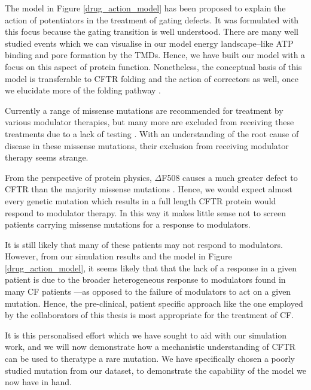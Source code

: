 The model in Figure \ref {drug_action_model} has been proposed to explain the action of potentiators in the treatment of gating defects. It was formulated with this focus because the gating transition is well understood. There are many well studied events which we can visualise in our model energy landscape--like ATP binding and pore formation by the TMDs. Hence, we have built our model with a focus on this aspect of protein function. Nonetheless, the conceptual basis of this model is transferable to CFTR folding and the action of correctors as well, once we elucidate more of the folding pathway \cite{krainer2018, kleizen2021, kleizen2020, padanyi2022, fiedorczuk2022}. 

Currently a range of missense mutations are recommended for treatment by various modulator therapies, but many more are excluded from receiving these treatments due to a lack of testing \cite{trikafta_FDA_info, kalydeco_FDA_approval, vangoor2014}. With an understanding of the root cause of disease in these missense mutations, their exclusion from receiving modulator therapy seems strange.

From the perspective of protein physics, $\Delta$F508 causes a much greater defect to CFTR than the majority missense mutations \cite{bahia2021}. Hence, we would expect almost every genetic mutation which results in a full length CFTR protein would respond to modulator therapy. In this way it makes little sense not to screen patients carrying missense mutations for a response to modulators. 

It is still likely that many of these patients may not respond to modulators. However, from our simulation results and the model in Figure \ref{drug_action_model}, it seems likely that that the lack of a response in a given patient is due to the broader heterogeneous response to modulators found in many CF patients \cite{boyle2014, donaldson2018, keating2018, matthes2018}---as opposed to the failure of modulators to act on a given mutation. Hence, the pre-clinical, patient specific approach like the one employed by the collaborators of this thesis is most appropriate for the treatment of CF. 

It is this personalised effort which we have sought to aid with our simulation work, and we will now demonstrate how a mechanistic understanding of CFTR can be used to theratype a rare mutation. We have specifically chosen a poorly studied mutation from our dataset, to demonstrate the capability of the model we now have in hand. 

